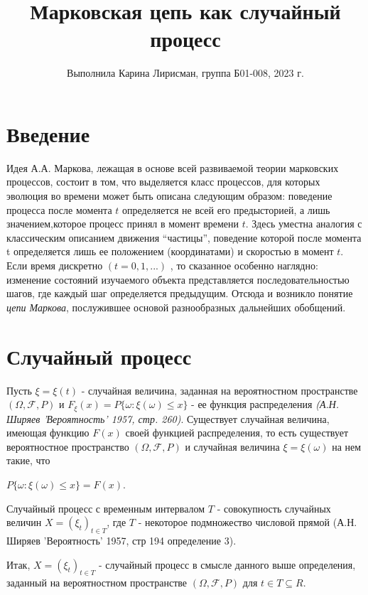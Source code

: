 \documentclass[12pt]{article}
\begin{document}
\Large{\title{\textbf{Марковская цепь как случайный процесс}}
\author{Выполнила Карина Лирисман, группа Б01-008, 2023 г.}
\date{}}

\maketitle

\section{Введение}

	Идея А.А. Маркова, лежащая в основе всей развиваемой теории марковских процессов, состоит в том, что выделяется класс процессов, для которых эволюция во времени может быть описана следующим образом: поведение процесса после момента $t$ определяется не всей его предысторией, а лишь значением,которое процесс принял в момент времени $t$. Здесь уместна аналогия с классическим описанием движения “частицы”, поведение которой после момента t опре­деляется лишь ее положением (координатами) и скоростью в момент $t$. Если время дискретно $(t = 0, 1,...)$ , то сказанное особенно наглядно: изменение состояний изучаемого объекта представляется последовательностью шагов, где каждый шаг
определяется предыдущим. Отсюда и возникло понятие \textit{цепи Маркова}, послужив­шее основой разнообразных дальнейших обобщений.


\section{Случайный процесс}
Пусть $\xi = \xi (t)$ - случайная величина, заданная на вероятностном пространстве $(\Omega , \mathscr{F}, P)$ и $F_{\xi} (x) = P \lbrace \omega : \xi (\omega) \leq x \rbrace$ - ее функция распределения \textit{(А.Н. Ширяев 'Вероятность'  1957, стр. 260)}. Существует случайная величина, имеющая функцию $F(x)$ своей функцией распределения, то есть существует вероятностное пространство $(\Omega , \mathscr{F}, P)$ и случайная величина $\xi = \xi (\omega)$ на нем такие, что 
\begin{center}
$P \lbrace \omega : \xi (\omega) \leq x \rbrace = F(x)$.
\end{center}

Случайный процесс с временным интервалом $T$ - совокупность случайных величин $X = (\xi_{t})_{t \in T }$, где $T$ - некоторое подмножество числовой прямой (А.Н. Ширяев 'Вероятность' 1957, стр 194 определение 3).

Итак, $X = (\xi_{t})_{t \in T }$ - случайный процесс в смысле данного выше определения, заданный на вероятностном пространстве $(\Omega , \mathscr{F}, P)$ для $t \in T \subseteq R$.
\end{document}
